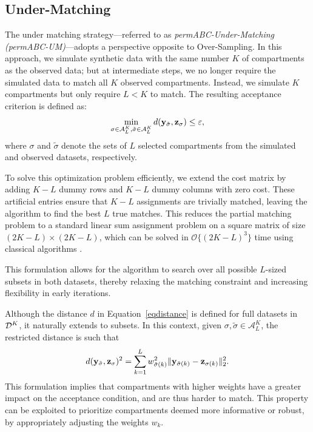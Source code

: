 \subsection{Under-Matching}
\label{sec:undermatching}
The under matching strategy—referred to as \emph{permABC-Under-Matching (permABC-UM)}—adopts a  perspective opposite to Over-Sampling. 
In this approach, we simulate synthetic data with the same number $K$ of compartments as the observed data; but at intermediate steps, we no longer require the simulated data to match all $K$ observed compartments. Instead, we simulate $K$ compartments but only require $L<K$ to match. The resulting acceptance criterion is defined as:
\begin{equation}
    \label{eqopti_um}
    \min_{\sigma \in \mathcal{A}_L^{K}, \tilde{\sigma} \in \mathcal{A}_L^{K}} d(\mathbf{y}_{\tilde \sigma}, \mathbf{z}_{\sigma}) \leq \varepsilon,
\end{equation}
where \( \sigma \) and \( \tilde{\sigma} \) denote the sets of \( L \) selected compartments from the simulated and observed datasets, respectively. 


To solve this optimization problem efficiently, we extend the cost matrix by adding \( K - L \) dummy rows and \( K - L \) dummy columns with zero cost. These artificial entries ensure that \( K - L \) assignments are trivially matched, leaving the algorithm to find the best \( L \) true matches. This reduces the partial matching problem to a standard linear sum assignment problem on a square matrix of size \( (2K - L) \times (2K - L) \), which can be solved in \( \mathcal{O}\{(2K-L)^3\} \) time using classical algorithms \citep{crouseImplementing2DRectangular2016a}. 
 

This formulation allows for the algorithm to search over all possible \( L \)-sized subsets in both datasets, thereby relaxing the matching constraint and increasing flexibility in early iterations.

Although the distance \( d \) in Equation~\eqref{eqdistance} is defined for full datasets in \( \mathcal{D}^K \), it naturally extends to subsets. In this context, given \( \sigma, \tilde \sigma \in \mathcal{A}_L^K \), the restricted distance is such that
\[
d(\mathbf{y}_{\tilde \sigma}, \mathbf{z}_{\sigma})^2 = {\sum_{k=1}^L w_{\tilde \sigma(k)}^2 \| \mathbf{y}_{\tilde \sigma(k)} - \mathbf{z}_{\sigma(k)} \|_2^2}.
\]
This formulation implies that compartments with higher weights have a greater impact on the acceptance condition, and are thus harder to match. This property can be exploited to prioritize compartments deemed more informative or robust, by appropriately adjusting the weights \( w_k \).


